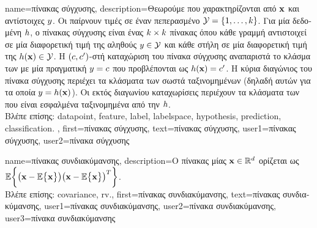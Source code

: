 {name={\foreignlanguage{greek}{πίνακας σύγχυσης}}, 
	description={\foreignlanguage{greek}{Θεωρούμε}   
		\foreignlanguage{greek}{που χαρακτηρίζονται από}  ${\bf x}$ \foreignlanguage{greek}{και 
		αντίστοιχες}  $y$. \foreignlanguage{greek}{Οι}   
		\foreignlanguage{greek}{παίρνουν τιμές σε έναν πεπερασμένο}  $\mathcal{Y} = \{1, \ldots, k\}$. 
		\foreignlanguage{greek}{Για μία δεδομένη}  $h$, \foreignlanguage{greek}{ο πίνακας σύγχυσης 
		είναι ένας $k \times k$ πίνακας όπου κάθε γραμμή αντιστοιχεί σε μία διαφορετική τιμή της αληθούς} 
		 $y \in \mathcal{Y}$ \foreignlanguage{greek}{και κάθε στήλη σε μία διαφορετική τιμή της}  
		 $h({\bf x}) \in \mathcal{Y}$. \foreignlanguage{greek}{Η $(c,c')$-στή 
		καταχώριση του πίνακα σύγχυσης αναπαριστά το κλάσμα των}  \foreignlanguage{greek}{με μία 
		πραγματική}  $y = c$ \foreignlanguage{greek}{που προβλέπονται ως  
		$h({\bf x}) = c'$. Η κύρια διαγώνιος του πίνακα σύγχυσης περιέχει τα κλάσματα των σωστά ταξινομημένων}
		 (\foreignlanguage{greek}{δηλαδή αυτών για τα οποία $y = h({\bf x})$). Οι 
		εκτός διαγωνίου καταχωρίσεις περιέχουν τα κλάσματα των}  \foreignlanguage{greek}{που είναι 
		εσφαλμένα ταξινομημένα από την} $h$. \\
		\foreignlanguage{greek}{Βλέπε επίσης:} \gls{datapoint}, \gls{feature}, \gls{label}, \gls{labelspace}, \gls{hypothesis}, \gls{prediction}, \gls{classification}. },
	first={\foreignlanguage{greek}{πίνακας σύγχυσης}},
	text={\foreignlanguage{greek}{πίνακας σύγχυσης}},
	user1={\foreignlanguage{greek}{πίνακας σύγχυσης}}, %
	user2={\foreignlanguage{greek}{πίνακα σύγχυσης}} %
}

{name={\foreignlanguage{greek}{πίνακας συνδιακύμανσης}}, 
	description={\foreignlanguage{greek}{Ο} 
		\foreignlanguage{greek}{πίνακας}  \foreignlanguage{greek}{μίας}  ${\bf x} \in \mathbb{R}^{d}$ 
		\foreignlanguage{greek}{ορίζεται ως} $\mathbb{E} \bigg \{ \big( {\bf x} - \mathbb{E} \big\{ {\bf x} \big\} \big)  \big({\bf x} - \mathbb{E} \big\{ {\bf x} \big\} \big)^{T} \bigg\}$.\\
		\foreignlanguage{greek}{Βλέπε επίσης:} \gls{covariance}, \gls{rv}.},
	first={\foreignlanguage{greek}{πίνακας συνδιακύμανσης}},
	text={\foreignlanguage{greek}{πίνακας συνδιακύμανσης}},
	user1={\foreignlanguage{greek}{πίνακας συνδιακύμανσης}}, %
  	user2={\foreignlanguage{greek}{πίνακα συνδιακύμανσης}}, %
	user3={\foreignlanguage{greek}{πίνακα συνδιακύμανσης}} %
}

